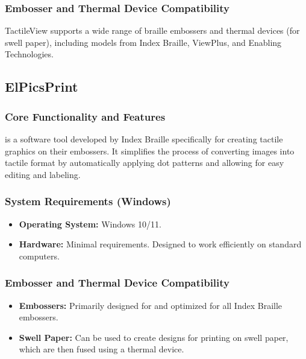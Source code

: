 \subsubsection{Embosser and Thermal Device Compatibility}\label{ch14:sssec:tactileview-compat}
TactileView supports a wide range of braille embossers and thermal devices (for swell paper), including models from Index Braille, ViewPlus, and Enabling Technologies.

\subsection{ElPicsPrint}\label{ch14:ssec:elpicsprint}
\subsubsection{Core Functionality and Features}\label{ch14:sssec:elpicsprint-features}
 is a software tool developed by Index Braille specifically for creating tactile graphics on their embossers. It simplifies the process of converting images into tactile format by automatically applying dot patterns and allowing for easy editing and labeling.

\subsubsection{System Requirements (Windows)}\label{ch14:sssec:elpicsprint-sysreq}
\begin{itemize}
	\item \textbf{Operating System:} Windows 10/11.
	\item \textbf{Hardware:} Minimal requirements. Designed to work efficiently on standard computers.
\end{itemize}

\subsubsection{Embosser and Thermal Device Compatibility}\label{ch14:sssec:elpicsprint-compat}
\begin{itemize}
	\item \textbf{Embossers:} Primarily designed for and optimized for all Index Braille embossers.
	\item \textbf{Swell Paper:} Can be used to create designs for printing on swell paper, which are then fused using a thermal device.
\end{itemize}

